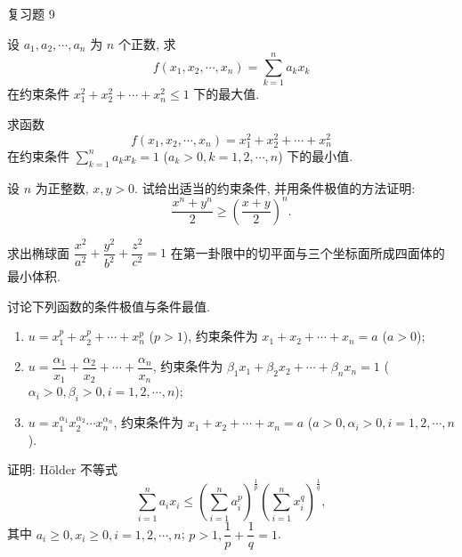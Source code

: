 
\begin{exblock}{复习题 9}
  \item 设 $a_{1}, a_{2}, \cdots, a_{n}$ 为 $n$ 个正数, 求
  \[
    f(x_{1}, x_{2}, \cdots, x_{n}) = \sum_{k=1}^{n} a_{k}x_{k}
  \]
  在约束条件 $x_{1}^{2} + x_{2}^{2} + \cdots + x_{n}^{2} \leqslant 1$ 下的最大值.

  \item 求函数
  \[
    f(x_{1}, x_{2}, \cdots, x_{n}) = x_{1}^{2} + x_{2}^{2} + \cdots + x_{n}^{2}
  \]
  在约束条件 $\sum\limits_{k=1}^{n} a_{k}x_{k} = 1$ ($a_{k} > 0, k = 1, 2, \cdots, n$) 下的最小值.

  \item 设 $n$ 为正整数, $x, y > 0$. 试给出适当的约束条件, 并用条件极值的方法证明:
  \[
    \frac{x^{n} + y^{n}}{2} \geqslant \left(\frac{x + y}{2}\right)^{n}.
  \]

  \item 求出椭球面 $\dfrac{x^{2}}{a^{2}} + \dfrac{y^{2}}{b^{2}} + \dfrac{z^{2}}{c^{2}} = 1$ 在第一卦限中的切平面与三个坐标面所成四面体的最小体积.

  \item 讨论下列函数的条件极值与条件最值.
  \begin{enumerate}
    \item $u = x_{1}^{p} + x_{2}^{p} + \cdots + x_{n}^{p}$ ($p > 1$), 约束条件为 $x_{1} + x_{2} + \cdots + x_{n} = a$ ($a > 0$);
    \item $u = \dfrac{\alpha_{1}}{x_{1}} + \dfrac{\alpha_{2}}{x_{2}} + \cdots + \dfrac{\alpha_{n}}{x_{n}}$, 约束条件为 $\beta_{1}x_{1} + \beta_{2}x_{2} + \cdots + \beta_{n}x_{n} = 1$ ($\alpha_{i} > 0, \beta_{i} > 0, i = 1, 2, \cdots, n$);
    \item $u = x_{1}^{\alpha_{1}}x_{2}^{\alpha_{2}}\cdots x_{n}^{\alpha_{n}}$, 约束条件为 $x_{1} + x_{2} + \cdots + x_{n} = a$ ($a > 0, \alpha_{i} > 0, i = 1, 2, \cdots, n$).
  \end{enumerate}

  \item 证明: H\"{o}lder 不等式
  \[
    \sum_{i=1}^{n} a_{i}x_{i} \leqslant \left(\sum_{i=1}^{n} a_{i}^{p}\right)^{\frac{1}{p}}\left(\sum_{i=1}^{n} x_{i}^{q}\right)^{\frac{1}{q}},
  \]
  其中 $a_{i} \geqslant 0, x_{i} \geqslant 0, i = 1, 2, \cdots, n$; $p > 1, \dfrac{1}{p} + \dfrac{1}{q} = 1$.


\end{exblock}
